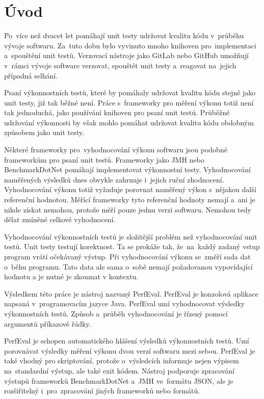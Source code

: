 \chapter*{Úvod}

Po~více než dvacet let pomáhají unit testy udržovat kvalitu kódu v~průběhu vývoje
softwaru. Za~tuto dobu bylo vyvinuto mnoho knihoven pro~implementaci a~spouštění
unit testů. Verzovací nástroje jako GitLab nebo GitHub umožňují v~rámci vývoje
software verzovat, spouštět unit testy a~reagovat na~jejich případná selhání.

Psaní výkonnostních testů, které by pomáhaly udržovat kvalitu kódu stejně jako unit testy,
již tak běžné není. Práce s~frameworky pro měření výkonu totiž není tak jednoduchá,
jako používání knihoven pro psaní unit testů. Průběžné udržování výkonnosti by však mohlo
pomáhat udržovat kvalitu kódu obdobným způsobem jako unit testy.

Některé frameworky pro~vyhodnocování výkonu softwaru jsou podobné frameworkům pro psaní unit testů.
Frameworky jako JMH nebo BenchmarkDotNet pomáhají implementovat výkonnostní testy.
Vyhodnocování naměřených výsledků dnes obvykle zahrnuje i~jejich ruční zhodnocení.
Vyhodnocování výkonu totiž vyžaduje porovnat naměřený výkon s~nějakou další referenční hodnotou.
Měřící frameworky tyto referenční hodnoty nemají a~ani je nikde získat nemohou,
protože měří pouze jednu verzi softwaru. Nemohou tedy dělat zmíněné celkové vyhodnocení.

Vyhodnocování výkonnostních testů je složitější problém než vyhodnocování unit testů.
Unit testy testují korektnost. Ta se prokáže tak, že~na~každý zadaný vstup program vrátí očekávaný výstup. Při vyhodnocování
výkonu se~změří sada dat o~běhu programu. Tato data ale sama o~sobě nemají požadovanou
vypovídající hodnotu a je nutné je zkoumat v kontextu.

Výsledkem této práce je nástroj nazvaný PerfEval. PerfEval je konzolová aplikace
napsaná v~programovacím jazyce Java. PerfEval umí vyhodnocovat výsledky
výkonnostních testů. Způsob a~průběh vyhodnocování je řízený pomocí argumentů příkazové řádky.

PerfEval je schopen automatického hlášení výsledků výkonnostních testů. Umí porovnávat
výsledky měření výkonu dvou verzí softwaru mezi sebou. PerfEval je také vhodný pro
skriptování, protože o~výsledcích informuje nejen výpisem na~standardní výstup, ale
také exit kódem. Nástroj podporuje zpracování výstupů frameworků BenchmarkDotNet a~JMH ve~formátu JSON,
ale je rozšiřitelný i~pro~zpracování jiných frameworků nebo formátů.
